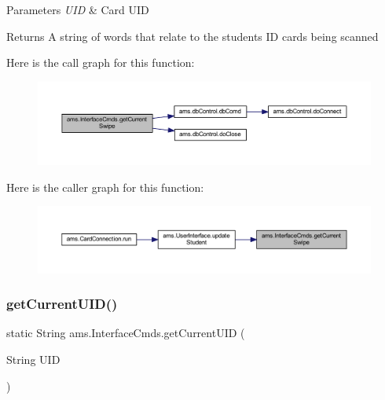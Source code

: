 \begin{DoxyParams}{Parameters}
{\em U\+ID} & Card U\+ID \\
\hline
\end{DoxyParams}
\begin{DoxyReturn}{Returns}
A string of words that relate to the student\textquotesingle{}s ID card\textquotesingle{}s being scanned 
\end{DoxyReturn}
Here is the call graph for this function\+:\nopagebreak
\begin{figure}[H]
\begin{center}
\leavevmode
\includegraphics[width=350pt]{classams_1_1_interface_cmds_aaae6e75ca4f733d4af6b2eb27844d730_cgraph}
\end{center}
\end{figure}
Here is the caller graph for this function\+:\nopagebreak
\begin{figure}[H]
\begin{center}
\leavevmode
\includegraphics[width=350pt]{classams_1_1_interface_cmds_aaae6e75ca4f733d4af6b2eb27844d730_icgraph}
\end{center}
\end{figure}
\mbox{\label{classams_1_1_interface_cmds_a130756a981203cad81e5d92a8bfaf1f0}} 
\subsubsection{\texorpdfstring{getCurrentUID()}{getCurrentUID()}}
{\footnotesize\ttfamily static String ams.\+Interface\+Cmds.\+get\+Current\+U\+ID (\begin{DoxyParamCaption}\item[{String}]{U\+ID }\end{DoxyParamCaption})\hspace{0.3cm}{\ttfamily [static]}}

